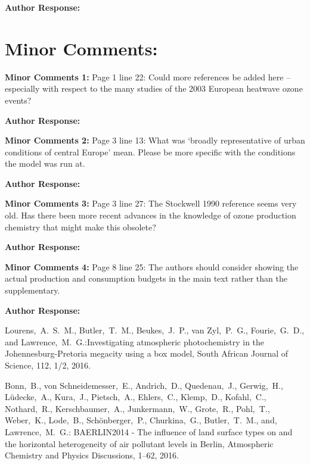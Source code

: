 \documentclass{article}
\begin{document}
\textbf{Author Response:}

\section*{Minor Comments:}

\textbf{Minor Comments 1:} Page 1 line 22: Could more references be added here – especially
with respect to the many studies of the 2003 European heatwave ozone events?

\textbf{Author Response:} 

\textbf{Minor Comments 2:}  Page 3 line 13: What was ‘broadly representative of urban conditions of central Europe’ mean. Please be more specific with the conditions the model was run at.

\textbf{Author Response:}

\textbf{Minor Comments 3:} Page 3 line 27: The Stockwell 1990 reference seems very old. Has there been more recent advances in the knowledge of ozone production chemistry that might make this obsolete?

\textbf{Author Response:}

\textbf{Minor Comments 4:}  Page 8 line 25: The authors should consider showing the actual production and consumption budgets in the main text rather than the supplementary.

\textbf{Author Response:}


\begin{thebibliography}{2}

     Lourens,~A.~S.~M., Butler,~T.~M., Beukes,~J.~P., van Zyl,~P.~G., Fourie,~G.~D., and Lawrence,~M.~G.:Investigating atmospheric photochemistry in the Johennesburg-Pretoria megacity using a box model, South African Journal of Science, 112, 1/2, 2016.

     Bonn,~B., von Schneidemesser,~E., Andrich,~D., Quedenau,~J., Gerwig,~H., L\"udecke,~A., Kura,~J., Pietsch,~A., Ehlers,~C., Klemp,~D., Kofahl,~C., Nothard,~R., Kerschbaumer,~A., Junkermann,~W., Grote,~R., Pohl,~T., Weber,~K., Lode,~B., Sch\"onberger,~P., Churkina,~G., Butler,~T.~M., and, Lawrence,~M.~G.: BAERLIN2014 - The influence of land surface types on and the horizontal heterogeneity of air pollutant levels in Berlin, Atmospheric Chemistry and Physics Discussions, 1--62, 2016.

\end{thebibliography}
\end{document}
